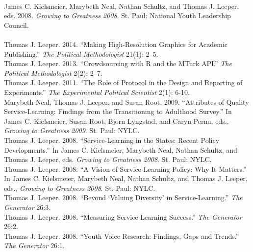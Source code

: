 \documentclass[12pt]{article}
\newcommand{\topic}[1]{\pagebreak[3]\indent {\color{lg}{\footnotesize #1 }}\\}
\newcommand{\entry}[1]{\indent {\color{lg}\guillemotright}\hspace{2pt}#1\vspace{.25em}\\}
\begin{document}

\topic{Edited Volume}
\entry{James C. Kielsmeier, Marybeth Neal, Nathan Schultz, and Thomas J. Leeper, eds. 2008. {\em Growing to Greatness 2008}. St. Paul: National Youth Leadership Council.}

\topic{Other Publications}
\entry{Thomas J. Leeper. 2014. ``Making High-Resolution Graphics for Academic Publishing.'' {\em The Political Methodologist} 21(1): 2--5.}
\entry{Thomas J. Leeper. 2013. ``Crowdsourcing with R and the MTurk API.'' {\em The Political Methodologist} 2(2): 2--7.}
\entry{Thomas J. Leeper. 2011. ``The Role of Protocol in the Design and Reporting of Experiments.'' {\em The Experimental Political Scientist} 2(1): 6-10.}%
\entry{Marybeth Neal, Thomas J. Leeper, and Susan Root. 2009. ``Attributes of Quality Service-Learning: Findings from the Transitioning to Adulthood Survey.'' In James C. Kielsmeier, Susan Root, Bjorn Lyngstad, and Caryn Pernu, eds., {\em Growing to Greatness 2009}. St. Paul: NYLC.}
\entry{Thomas J. Leeper. 2008. ``Service-Learning in the States: Recent Policy Developments.'' In James C. Kielsmeier, Marybeth Neal, Nathan Schultz, and Thomas J. Leeper, eds. {\em Growing to Greatness 2008}. St. Paul: NYLC.}
\entry{Thomas J. Leeper. 2008. ``A Vision of Service-Learning Policy: Why It Matters.'' In James C. Kielsmeier, Marybeth Neal, Nathan Schultz, and Thomas J. Leeper, eds., {\em Growing to Greatness 2008}. St. Paul: NYLC.}
\entry{Thomas J. Leeper. 2008. ``Beyond `Valuing Diversity' in Service-Learning.'' {\em The Generator} 26:3.}
\entry{Thomas J. Leeper. 2008. ``Measuring Service-Learning Success.'' {\em The Generator} 26:2.}
\entry{Thomas J. Leeper. 2008. ``Youth Voice Research: Findings, Gaps and Trends.'' {\em The Generator} 26:1.}
\end{document}
